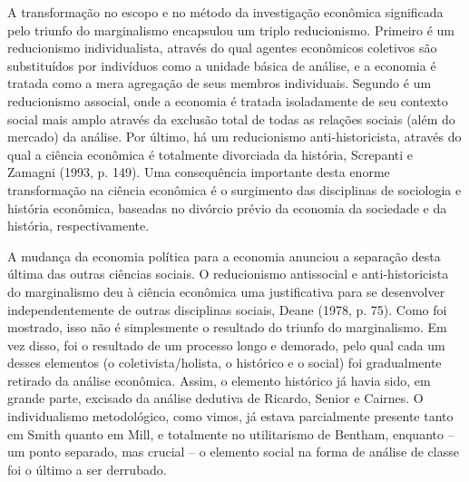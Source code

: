 \documentclass[12pt]{article}
\begin{document}
A transformação no escopo e no método da investigação econômica significada pelo triunfo do marginalismo encapsulou um triplo reducionismo. Primeiro é um reducionismo individualista, através do qual agentes econômicos coletivos são substituídos por indivíduos como a unidade básica de análise, e a economia é tratada como a mera agregação de seus membros individuais. Segundo é um reducionismo associal, onde a economia é tratada isoladamente de seu contexto social mais amplo através da exclusão total de todas as relações sociais (além do mercado) da análise. Por último, há um reducionismo anti-historicista, através do qual a ciência econômica é totalmente divorciada da história, Screpanti e Zamagni (1993, p. 149). Uma consequência importante desta enorme transformação na ciência econômica é o surgimento das disciplinas de sociologia e história econômica, baseadas no divórcio prévio da economia da sociedade e da história, respectivamente.

A mudança da economia política para a economia anunciou a separação desta última das outras ciências sociais. O reducionismo antissocial e anti-historicista do marginalismo deu à ciência econômica uma justificativa para se desenvolver independentemente de outras disciplinas sociais, Deane (1978, p. 75). Como foi mostrado, isso não é simplesmente o resultado do triunfo do marginalismo. Em vez disso, foi o resultado de um processo longo e demorado, pelo qual cada um desses elementos (o coletivista/holista, o histórico e o social) foi gradualmente retirado da análise econômica. Assim, o elemento histórico já havia sido, em grande parte, excisado da análise dedutiva de Ricardo, Senior e Cairnes. O individualismo metodológico, como vimos, já estava parcialmente presente tanto em Smith quanto em Mill, e totalmente no utilitarismo de Bentham, enquanto – um ponto separado, mas crucial – o elemento social na forma de análise de classe foi o último a ser derrubado.
\end{document}
